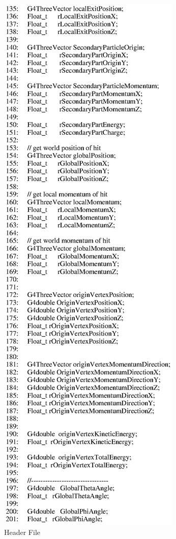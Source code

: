 \begin{figure}[h]
  \hspace{0cm}
  \includegraphics[scale=0.8]{./figures13/QweakSimEventAction.hh-p3.eps}
  \caption{Header File}
           \label{fig:XIII-SC-13}
\end{figure}


